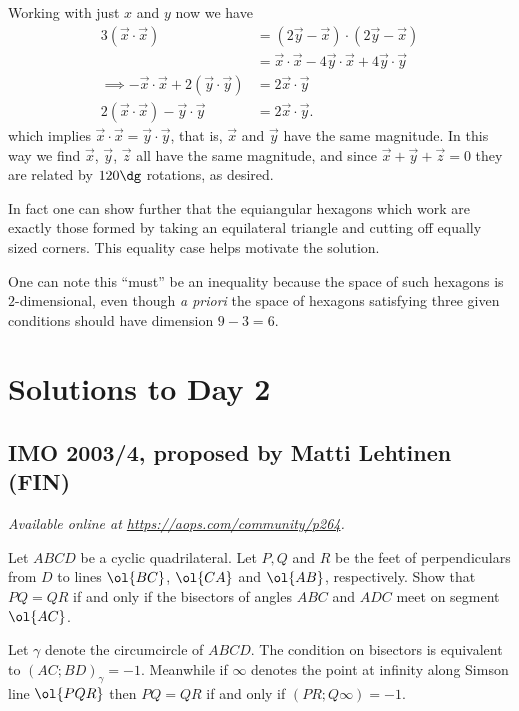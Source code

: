 \documentclass[11pt]{scrartcl}
\begin{document}
Working with just $x$ and $y$ now we have
\begin{align*}
  3 (\vec x \cdot \vec x) &= (2 \vec y - \vec x) \cdot (2 \vec y - \vec x) \\
  &= \vec x \cdot \vec x - 4 \vec y \cdot \vec x + 4 \vec y \cdot \vec y \\
  \implies
  -\vec x \cdot \vec x + 2 (\vec y \cdot \vec y) &= 2 \vec x \cdot \vec y \\
  2 (\vec x \cdot \vec x) - \vec y \cdot \vec y &= 2 \vec x \cdot \vec y.
\end{align*}
which implies $\vec x \cdot \vec x = \vec y \cdot \vec y$,
that is, $\vec x$ and $\vec y$ have the same magnitude.
In this way we find $\vec x$, $\vec y$, $\vec z$ all
have the same magnitude,
and since $\vec x + \vec y + \vec z = 0$
they are related by $120\dg$ rotations, as desired.

\begin{remark*}
  In fact one can show further that the equiangular hexagons
  which work are exactly those formed by taking an equilateral triangle
  and cutting off equally sized corners.
  This equality case helps motivate the solution.
\end{remark*}
\begin{remark*}
  One can note this ``must'' be an inequality
  because the space of such hexagons is $2$-dimensional,
  even though \emph{a priori} the space of hexagons satisfying
  three given conditions should have dimension $9-3=6$.
\end{remark*}
\pagebreak

\section{Solutions to Day 2}
\subsection{IMO 2003/4, proposed by Matti Lehtinen (FIN)}
\textsl{Available online at \url{https://aops.com/community/p264}.}
\begin{mdframed}[style=mdpurplebox,frametitle={Problem statement}]
Let $ABCD$ be a cyclic quadrilateral.
Let $P, Q$ and $R$ be the feet of perpendiculars
from $D$ to lines $\ol{BC}$, $\ol{CA}$ and $\ol{AB}$, respectively.
Show that $PQ = QR$ if and only if the
bisectors of angles $ABC$ and $ADC$ meet on segment $\ol{AC}$.
\end{mdframed}
Let $\gamma$ denote the circumcircle of $ABCD$.
The condition on bisectors is equivalent to $(AC;BD)_\gamma = -1$.
Meanwhile if $\infty$ denotes the point at infinity along Simson line $\ol{PQR}$
then $PQ = QR$ if and only if $(PR;Q\infty) = -1$.
\end{document}
